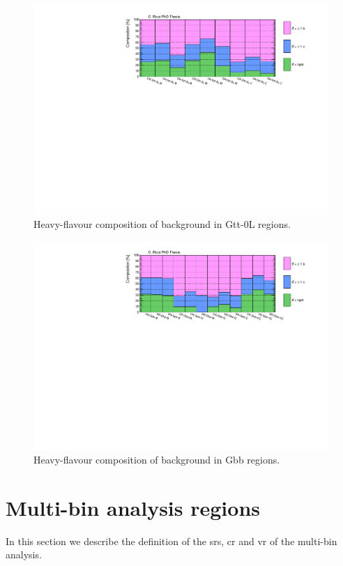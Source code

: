 \begin{figure}[htbp]
\includegraphics[width=\textwidth]{figures/strong_prod/comp_plots/Gtt_0L_HF.pdf}
\caption{Heavy-flavour composition of \ttbar background in Gtt-0L regions.}
	\label{fig:HFcomp_Gtt0L}
\end{figure}

\begin{figure}[htbp]
\includegraphics[width=\textwidth]{figures/strong_prod/comp_plots/Gbb_HF.pdf}
\caption{Heavy-flavour composition of \ttbar background in Gbb regions.}
	\label{fig:HFcomp_Gbb}
\end{figure}


\FloatBarrier

\section{Multi-bin analysis regions}
\label{sec:strong:multibin}
In this section we describe the definition of the \glspl{sr}, \gls{cr} and \gls{vr} 
of the multi-bin analysis. 

